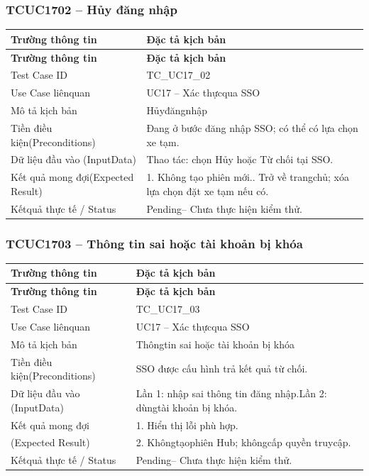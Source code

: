 \subsubsection{TCUC1702 – Hủy đăng nhập}
\begin{longtable}{|L{0.24\textwidth}|L{0.70\textwidth}|}
\hline
\textbf{Trường thông tin} & \textbf{Đặc tả kịch bản} \\
\hline
\endfirsthead
\hline
\textbf{Trường thông tin} & \textbf{Đặc tả kịch bản} \\
\hline
\endhead
Test Case ID & TC\_UC17\_02 \\
\hline
Use Case liênquan & UC17 – Xác thựcqua SSO \\
\hline
Mô tả kịch bản & Hủyđăngnhập \\
\hline
Tiền điều kiện\newline (Preconditions) & Đang ở bước đăng nhập SSO; có thể có lựa chọn xe tạm. \\
\hline
Dữ liệu đầu vào (Input\newline Data) & Thao tác: chọn Hủy hoặc Từ chối tại SSO. \\
\hline
Kết quả mong đợi\newline (Expected Result) & 1. Không tạo phiên mới.. Trở về trangchủ; xóa lựa chọn đặt xe tạm nếu có. \\
\hline
Kếtquả thực tế / Status & Pending– Chưa thực hiện kiểm thử. \\
\hline
\end{longtable}
\vspace{-0.5\baselineskip}
\subsubsection{TCUC1703 – Thông tin sai hoặc tài khoản bị khóa}
\begin{longtable}{|L{0.24\textwidth}|L{0.70\textwidth}|}
\hline
\textbf{Trường thông tin} & \textbf{Đặc tả kịch bản} \\
\hline
\endfirsthead
\hline
\textbf{Trường thông tin} & \textbf{Đặc tả kịch bản} \\
\hline
\endhead
Test Case ID & TC\_UC17\_03 \\
\hline
Use Case liênquan & UC17 – Xác thựcqua SSO \\
\hline
Mô tả kịch bản & Thôngtin sai hoặc tài khoản bị khóa \\
\hline
Tiền điều kiện\newline (Preconditions) & SSO được cấu hình trả kết quả từ chối. \\
\hline
Dữ liệu đầu vào (Input\newline Data) & Lần 1: nhập sai thông tin đăng nhập.\newline Lần 2: dùngtài khoản bị khóa. \\
\hline
Kết quả mong đợi & 1. Hiển thị lỗi phù hợp. \\
\hline
(Expected Result) & 2. Khôngtạophiên Hub; khôngcấp quyền truycập. \\
\hline
Kếtquả thực tế / Status & Pending– Chưa thực hiện kiểm thử. \\
\hline
\end{longtable}
\vspace{-0.5\baselineskip}
